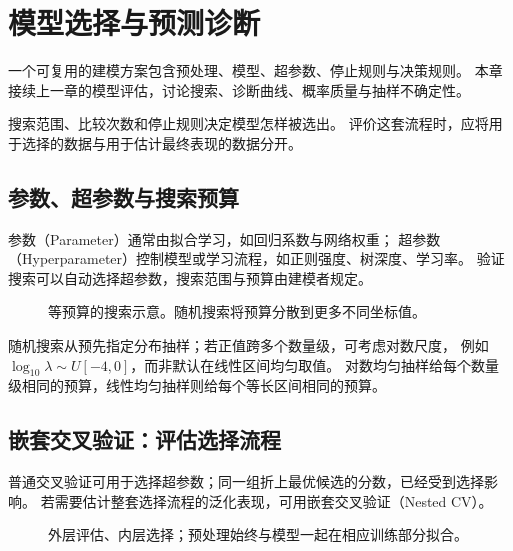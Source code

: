 \chapter{模型选择与预测诊断}
\label{ch:diagnostics}

一个可复用的建模方案包含预处理、模型、超参数、停止规则与决策规则。
本章接续上一章的模型评估，讨论搜索、诊断曲线、概率质量与抽样不确定性。

\begin{keyidea}[评价完整的选择流程]
搜索范围、比较次数和停止规则决定模型怎样被选出。
评价这套流程时，应将用于选择的数据与用于估计最终表现的数据分开。
\end{keyidea}

\section{参数、超参数与搜索预算}
\label{sec:diag-search}
参数（Parameter）通常由拟合学习，如回归系数与网络权重；
超参数（Hyperparameter）控制模型或学习流程，如正则强度、树深度、学习率。
验证搜索可以自动选择超参数，搜索范围与预算由建模者规定。

\begin{figure}[htbp]
\centering
\caption{等预算的搜索示意。随机搜索将预算分散到更多不同坐标值。}
\par\smallskip
{}
\end{figure}

随机搜索从预先指定分布抽样；若正值跨多个数量级，可考虑对数尺度，
例如$\log_{10}\lambda\sim U[-4,0]$，而非默认在线性区间均匀取值。
对数均匀抽样给每个数量级相同的预算，线性均匀抽样则给每个等长区间相同的预算。


\section{嵌套交叉验证：评估选择流程}
\label{sec:diag-nested}
普通交叉验证可用于选择超参数；同一组折上最优候选的分数，已经受到选择影响。
若需要估计整套选择流程的泛化表现，可用嵌套交叉验证（Nested CV）。

\begin{figure}[htbp]
\centering
\caption{外层评估、内层选择；预处理始终与模型一起在相应训练部分拟合。}
\par\smallskip
{}
\end{figure}

